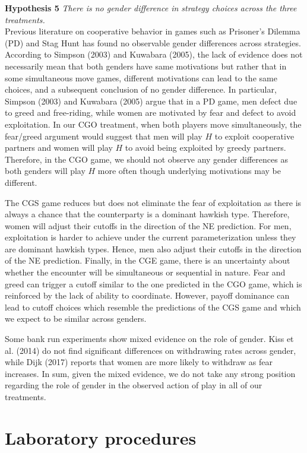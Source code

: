 \documentclass[12pt, letterpaper]{article}
\theoremstyle{plain}
\begin{document}
\noindent \textbf{Hypothesis 5}
\textit{There is no gender difference in strategy choices across the three treatments.}\\

Previous literature on cooperative behavior in games such as Prisoner's Dilemma (PD) and Stag Hunt has found no observable gender differences across strategies. According to Simpson (2003) and Kuwabara (2005), the lack of evidence does not necessarily mean that both genders have same motivations but rather that in some simultaneous move games, different motivations can lead to the same choices, and a subsequent conclusion of no gender difference. In particular, Simpson (2003) and Kuwabara (2005) argue that in a PD game, men defect due to greed and free-riding, while women are motivated by fear and defect to avoid exploitation. In our CGO treatment, when both players move simultaneously, the fear/greed argument would suggest that men will play $H$ to exploit cooperative partners and women will play $H$ to avoid being exploited by greedy partners. Therefore, in the CGO game, we should not observe any gender differences as both genders will play $H$ more often though underlying motivations may be different.

The CGS game reduces but does not eliminate the fear of exploitation as there is always a chance that the counterparty is a dominant hawkish type. Therefore, women will adjust their cutoffs in the direction of the NE prediction. For men, exploitation is harder to achieve under the current parameterization unless they are dominant hawkish types. Hence, men also adjust their cutoffs in the direction of the NE prediction. Finally, in the CGE game, there is an uncertainty about whether the encounter will be simultaneous or sequential in nature. Fear and greed can trigger a cutoff similar to the one predicted in the CGO game, which is reinforced by the lack of ability to coordinate. However, payoff dominance can lead to cutoff choices which resemble the predictions of the CGS game and which we expect to be similar across genders.  

Some bank run experiments show mixed evidence on the role of gender. Kiss et al. (2014) do not find significant differences on withdrawing rates across gender, while Dijk (2017) reports that women are more likely to withdraw as fear increases. In sum, given the mixed evidence, we do not take any strong position regarding the role of gender in the observed action of play in all of our treatments.


\section{Laboratory procedures}
\label{sec:game}
\end{document}
